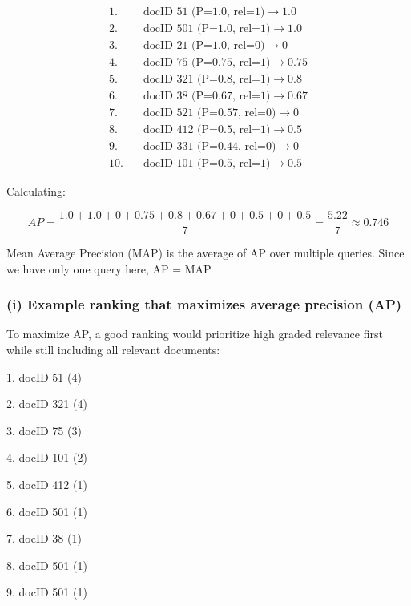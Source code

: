 \documentclass[a4paper, utf8]{ctexart}
\begin{document}
	\begin{flushleft}
	\begin{align*}
	1. & \quad \text{docID 51 (P=1.0, rel=1)} \rightarrow 1.0 \\
	2. & \quad \text{docID 501 (P=1.0, rel=1)} \rightarrow 1.0 \\
	3. & \quad \text{docID 21 (P=1.0, rel=0)} \rightarrow 0 \\
	4. & \quad \text{docID 75 (P=0.75, rel=1)} \rightarrow 0.75 \\
	5. & \quad \text{docID 321 (P=0.8, rel=1)} \rightarrow 0.8 \\
	6. & \quad \text{docID 38 (P=0.67, rel=1)} \rightarrow 0.67 \\
	7. & \quad \text{docID 521 (P=0.57, rel=0)} \rightarrow 0 \\
	8. & \quad \text{docID 412 (P=0.5, rel=1)} \rightarrow 0.5 \\
	9. & \quad \text{docID 331 (P=0.44, rel=0)} \rightarrow 0 \\
	10. & \quad \text{docID 101 (P=0.5, rel=1)} \rightarrow 0.5
	\end{align*}
	\end{flushleft}
	
	Calculating:
	
	\[
	AP = \frac{1.0 + 1.0 + 0 + 0.75 + 0.8 + 0.67 + 0 + 0.5 + 0 + 0.5}{7} = \frac{5.22}{7} \approx 0.746
	\]
	
	Mean Average Precision (MAP) is the average of AP over multiple queries. Since we have only one query here, AP = MAP.
	
	\subsubsection*{(i) Example ranking that maximizes average precision (AP)}
	
	To maximize AP, a good ranking would prioritize high graded relevance first while still including all relevant documents:
	
	1. docID 51 (4)  
	
	2. docID 321 (4)  
	
	3. docID 75 (3)  
	
	4. docID 101 (2)  
	
	5. docID 412 (1)  
	
	6. docID 501 (1)  
	
	7. docID 38 (1)  
	
	8. docID 501 (1)  
	
	9. docID 501 (1)  
	
\end{document}
